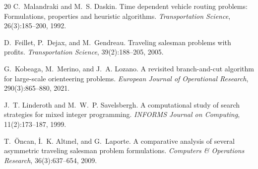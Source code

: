 \documentclass[11pt,a4paper]{article}
\begin{document}
\begin{thebibliography}{20}
C.~Malandraki and M.~S. Daskin.
\newblock Time dependent vehicle routing problems: Formulations, properties and heuristic algorithms.
\newblock \emph{Transportation Science}, 26(3):185--200, 1992.

D.~Feillet, P.~Dejax, and M.~Gendreau.
\newblock Traveling salesman problems with profits.
\newblock \emph{Transportation Science}, 39(2):188--205, 2005.

G.~Kobeaga, M.~Merino, and J.~A. Lozano.
\newblock A revisited branch-and-cut algorithm for large-scale orienteering problems.
\newblock \emph{European Journal of Operational Research}, 290(3):865--880, 2021.

J.~T. Linderoth and M.~W.~P. Savelsbergh.
\newblock A computational study of search strategies for mixed integer programming.
\newblock \emph{INFORMS Journal on Computing}, 11(2):173--187, 1999.

T.~\"{O}ncan, \.{I}.~K. Altınel, and G.~Laporte.
\newblock A comparative analysis of several asymmetric traveling salesman problem formulations.
\newblock \emph{Computers \& Operations Research}, 36(3):637--654, 2009.

\end{thebibliography}
\end{document}
